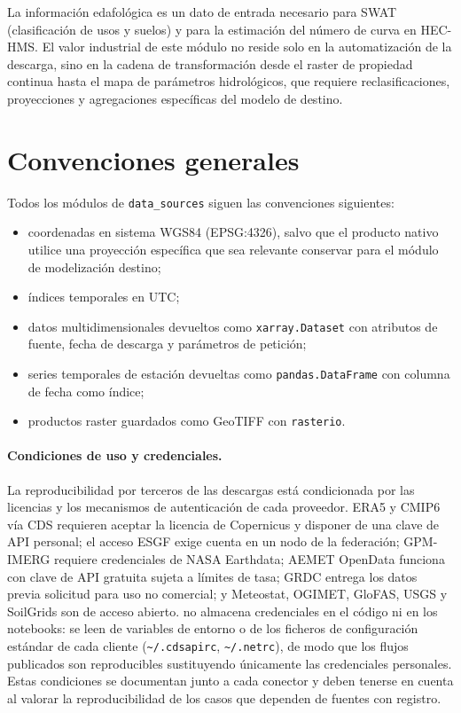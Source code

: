 La información edafológica es un dato de entrada necesario para SWAT (clasificación de usos y suelos) y para la estimación del número de curva en HEC-HMS. El valor industrial de este módulo no reside solo en la automatización de la descarga, sino en la cadena de transformación desde el raster de propiedad continua hasta el mapa de parámetros hidrológicos, que requiere reclasificaciones, proyecciones y agregaciones específicas del modelo de destino.

\section{Convenciones generales}

Todos los módulos de \texttt{data\_sources} siguen las convenciones siguientes:
\begin{itemize}
  \item coordenadas en sistema WGS84 (EPSG:4326), salvo que el producto nativo utilice una proyección específica que sea relevante conservar para el módulo de modelización destino;
  \item índices temporales en UTC;
  \item datos multidimensionales devueltos como \texttt{xarray.Dataset} con atributos de fuente, fecha de descarga y parámetros de petición;
  \item series temporales de estación devueltas como \texttt{pandas.DataFrame} con columna de fecha como índice;
  \item productos raster guardados como GeoTIFF con \texttt{rasterio}.
\end{itemize}

\paragraph{Condiciones de uso y credenciales.}
La reproducibilidad por terceros de las descargas está condicionada por las licencias y los mecanismos de autenticación de cada proveedor. ERA5 y CMIP6 vía CDS requieren aceptar la licencia de Copernicus y disponer de una clave de API personal; el acceso ESGF exige cuenta en un nodo de la federación; GPM-IMERG requiere credenciales de NASA Earthdata; AEMET OpenData funciona con clave de API gratuita sujeta a límites de tasa; GRDC entrega los datos previa solicitud para uso no comercial; y Meteostat, OGIMET, GloFAS, USGS y SoilGrids son de acceso abierto. \pyhydra no almacena credenciales en el código ni en los notebooks: se leen de variables de entorno o de los ficheros de configuración estándar de cada cliente (\texttt{\textasciitilde/.cdsapirc}, \texttt{\textasciitilde/.netrc}), de modo que los flujos publicados son reproducibles sustituyendo únicamente las credenciales personales. Estas condiciones se documentan junto a cada conector y deben tenerse en cuenta al valorar la reproducibilidad de los casos que dependen de fuentes con registro.
